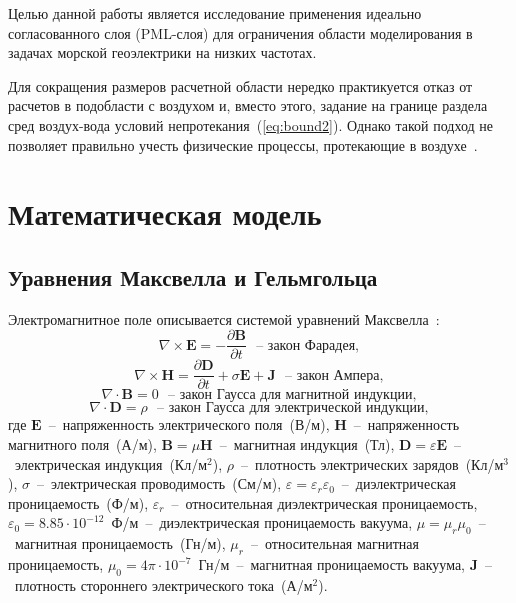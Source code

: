 \documentclass[a4paper,14pt]{article}
\begin{document}
Целью данной работы является исследование применения идеально согласованного слоя (PML-слоя) для ограничения области моделирования в задачах морской геоэлектрики на низких частотах.

Для сокращения размеров расчетной области нередко практикуется отказ от расчетов в подобласти с воздухом и, вместо этого, задание на границе раздела сред воздух-вода условий непротекания~(\ref{eq:bound2}). Однако такой подход не позволяет правильно учесть физические процессы, протекающие в воздухе~\citep{anderson}. %

\clearpage
\section{Математическая модель}
\subsection{Уравнения Максвелла и Гельмгольца}
Электромагнитное поле описывается системой уравнений Максвелла~\citep{epov}:
\begin{equation}
	\nabla \times \mathbf{E} = - \frac{ \partial \mathbf{B} }{ \partial t } \text{~~--~закон Фарадея}, \label{eq:maxwell:faradey}
\end{equation}
\begin{equation}
	\nabla \times \mathbf{H} = \frac{ \partial \mathbf{D} }{ \partial t } + \sigma \mathbf{E} + \mathbf{J} \text{~~--~закон Ампера}, \label{eq:maxwell:amper}
\end{equation}
\begin{equation*}
	\nabla \cdot \mathbf{B} = 0 \text{~~--~закон Гаусса для магнитной индукции}, \label{eq:maxwell:gauss_magn}
\end{equation*}
\begin{equation*}
	\nabla \cdot \mathbf{D} = \rho \text{~~--~закон Гаусса для электрической индукции}, \label{eq:maxwell:gauss_elect}
\end{equation*}
где $\mathbf{E}$~--~напряженность электрического поля~(В/м), $\mathbf{H}$~--~напряженность магнитного поля~(А/м), $\mathbf{B}=\mu \mathbf{H}$~--~магнитная индукция~(Тл), $\mathbf{D}=\varepsilon \mathbf{E}$~--~электрическая индукция~(Кл/м${}^2$), $\rho$~--~плотность электрических зарядов~(Кл/м${}^3$), $\sigma$~--~электрическая проводимость~(См/м), $\varepsilon = \varepsilon_r \varepsilon_0$~--~диэлектрическая проницаемость~(Ф/м), $\varepsilon_r$~--~относительная диэлектрическая проницаемость, $\varepsilon_0 = 8.85 \cdot 10^{-12}$~Ф/м~--~диэлектрическая проницаемость вакуума, $\mu = \mu_r \mu_0$~--~магнитная проницаемость~(Гн/м), $\mu_r$~--~относительная магнитная проницаемость, $\mu_0 = 4 \pi \cdot 10^{-7}$~Гн/м~--~магнитная проницаемость вакуума, $\mathbf{J}$~--~плотность стороннего электрического тока~(А/м${}^2$).
\end{document}
